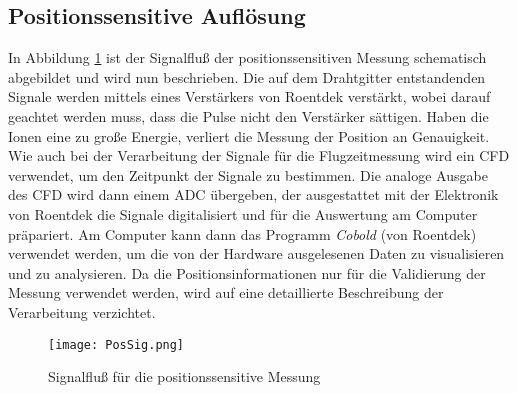 \subsection{Positionssensitive Auflösung}
In Abbildung \ref{fig:pos} ist der Signalfluß der positionssensitiven Messung schematisch abgebildet und wird nun beschrieben. Die auf dem Drahtgitter entstandenden Signale werden mittels eines Verstärkers von Roentdek verstärkt, wobei darauf geachtet werden muss, dass die Pulse nicht den Verstärker sättigen. Haben die Ionen eine zu große Energie, verliert die Messung der Position an Genauigkeit. Wie auch bei der Verarbeitung der Signale für die Flugzeitmessung wird ein CFD verwendet, um den Zeitpunkt der Signale zu bestimmen. Die analoge Ausgabe des CFD wird dann einem ADC übergeben, der ausgestattet mit der Elektronik von Roentdek die Signale digitalisiert und für die Auswertung am Computer präpariert. Am Computer kann dann das Programm \textit{Cobold} (von Roentdek) verwendet werden, um die von der Hardware ausgelesenen Daten zu visualisieren und zu analysieren. Da die Positionsinformationen nur für die Validierung der Messung verwendet werden, wird auf eine detaillierte Beschreibung der Verarbeitung verzichtet.

\begin{figure}
    \centering
    \texttt{[image: PosSig.png]}
    \caption[Signalfluß für die positionssensitive Messung]{Signalfluß für die positionssensitive Messung}
    \label{fig:pos} 
\end{figure}
